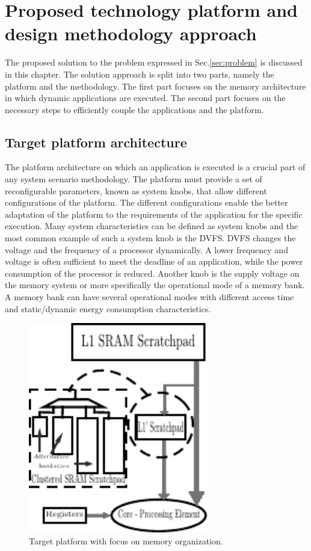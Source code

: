 \chapter{Proposed technology platform and design methodology approach}
\label{method}
The proposed solution to the problem expressed in Sec.\ref{sec:problem} is discussed in this chapter.
The solution approach is split into two parts, namely the platform and the methodology.
The first part focuses on the memory architecture in which dynamic applications are executed.
The second part focuses on the necessary steps to efficiently couple the applications and the platform.

\section{Target platform architecture}

The platform architecture on which an application is executed is a crucial part of any system scenario methodology.
The platform must provide a set of reconfigurable parameters, known as system knobs, that allow different configurations of the platform.
The different configurations enable the better adaptation of the platform to the requirements of the application for the specific execution.
Many system characteristics can be defined as system knobs and the most common example of such a system knob is the DVFS.
DVFS changes the voltage and the frequency of a processor dynamically.
A lower frequency and voltage is often sufficient to meet the deadline of an application, while the power consumption of the processor is reduced.
Another knob is the supply voltage on the memory system or more specifically the operational mode of a memory bank.
A memory bank can have several operational modes with different access time and static/dynamic energy consumption characteristics.

\begin{figure}
	\centering
	\includegraphics[width=0.7\textwidth]{Images/platform.pdf}
	\caption{Target platform with focus on memory organization. }
	\label{fig:pltfrm}
\end{figure}

